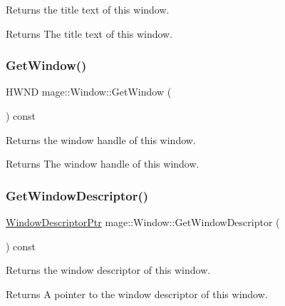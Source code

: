 Returns the title text of this window.

\begin{DoxyReturn}{Returns}
The title text of this window. 
\end{DoxyReturn}
\mbox{\label{classmage_1_1_window_a0f791c3fb8f5be34a17ae2a93767a613}} 
\subsubsection{\texorpdfstring{Get\+Window()}{GetWindow()}}
{\footnotesize\ttfamily H\+W\+ND mage\+::\+Window\+::\+Get\+Window (\begin{DoxyParamCaption}{ }\end{DoxyParamCaption}) const\hspace{0.3cm}{\ttfamily [noexcept]}}

Returns the window handle of this window.

\begin{DoxyReturn}{Returns}
The window handle of this window. 
\end{DoxyReturn}
\mbox{\label{classmage_1_1_window_add5b20d191810ba04000728c7517543f}} 
\subsubsection{\texorpdfstring{Get\+Window\+Descriptor()}{GetWindowDescriptor()}}
{\footnotesize\ttfamily \mbox{\hyperlink{classmage_1_1_window_ac41b052d8e8dd0571b3ec862e8f6da05}{Window\+Descriptor\+Ptr}} mage\+::\+Window\+::\+Get\+Window\+Descriptor (\begin{DoxyParamCaption}{ }\end{DoxyParamCaption}) const\hspace{0.3cm}{\ttfamily [noexcept]}}

Returns the window descriptor of this window.

\begin{DoxyReturn}{Returns}
A pointer to the window descriptor of this window. 
\end{DoxyReturn}
\mbox{\label{classmage_1_1_window_a1bd8a958bb5e15f22982a74a513a715e}} 
